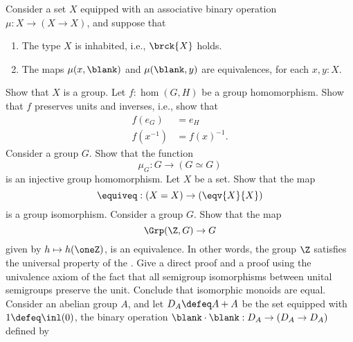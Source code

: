 \begin{exercises}
  \exitem Consider a set $X$ equipped with an associative binary operation $\mu:X\to (X\to X)$, and suppose that
  \begin{enumerate}
  \item The type $X$ is inhabited, i.e., $\brck{X}$ holds.
  \item The maps $\mu(x,\blank)$ and $\mu(\blank,y)$ are equivalences, for each $x,y:X$.
  \end{enumerate}
  Show that $X$ is a group.
  \exitem Let $f:\hom(G,H)$ be a group homomorphism. Show that $f$ preserves units and inverses, i.e., show that
  \begin{align*}
    f(e_G) & = e_H \\
    f(x^{-1}) & = f(x)^{-1}.
  \end{align*}
  \exitem \label{ex:groupop-embedding}
  Consider a group $G$. Show that the function
  \begin{equation*}
    \mu_G:G\to (G\simeq G)
  \end{equation*}
  is an injective group homomorphism.
  \exitem Let $X$ be a set. Show that the map
  \begin{equation*}
    \equiveq : (X=X)\to (\eqv{X}{X})
  \end{equation*}
  is a group isomorphism.
  \exitem Consider a group $G$. Show that the map
  \begin{equation*}
    \Grp(\Z,G)\to G
  \end{equation*}
  given by $h\mapsto h(\oneZ)$, is an equivalence. In other words, the group $\Z$ satisfies the universal property of the .
  \exitem Give a direct proof and a proof using the univalence axiom of the fact that all semigroup isomorphisms between unital semigroups preserve the unit. Conclude that isomorphic monoids are equal.
  \exitem \label{ex:dihedral-group}Consider an abelian group $A$, and let $D_A\defeq A+A$ be the set equipped with $1\defeq\inl(0)$, the binary operation ${\blank}\cdot{\blank}:D_A\to (D_A\to D_A)$ defined by

\end{exercises}
